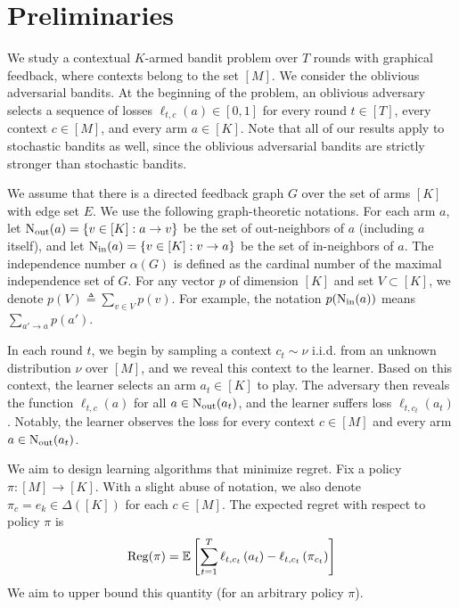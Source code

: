 \section{Preliminaries}
We study a contextual $K$-armed bandit problem over $T$ rounds with graphical feedback, where contexts belong to the set $[M]$. 
%
We consider the oblivious adversarial bandits.
%
At the beginning of the problem, an oblivious adversary selects a sequence of losses $\ell_{t, c}(a) \in [0,1]$ for every round $t \in[T]$, every context $c \in[M]$, and every arm $a \in[K]$. 
%
Note that all of our results apply to stochastic bandits as well, since the oblivious adversarial bandits are strictly stronger than  stochastic bandits. 

We assume that there is a directed feedback graph $G$ over the set of arms $[K]$ with edge set $E$. We use the following graph-theoretic notations.  For each arm $a$, let $\operatorname{N_{\text{out}}}(a) = \{v \in [K]: a \rightarrow v\}$ be the set of out-neighbors of $a$ (including $a$ itself), and let $\operatorname{N_{\text{in}}}(a)=\{v \in [K]: v \rightarrow a\}$ be the set of in-neighbors of $a$. The independence number $\alpha(G)$ is defined as the cardinal number of the maximal independence set of $G$. For any vector $p$ of dimension $[K]$ and set $V \subset [K]$, we denote $p(V) \triangleq \sum_{v \in V} p(v)$. For example, the notation $p(\operatorname{N_{\text{in}}}(a))$ means $\sum_{a' \rightarrow a} p(a')$.

In each round $t$, we begin by sampling a context $c_t \sim \nu$ i.i.d. from an unknown distribution $\nu$ over $[M]$, and we reveal this context to the learner. 
%
Based on this context, the learner selects an arm $a_t \in[K]$ to play.
%
The adversary then reveals the function $\ell_{t, c}\left(a\right)$ for all $a \in \operatorname{N_{\text{out}}}(a_t)$, and the learner suffers loss $\ell_{t, c_t}\left(a_t\right)$. 
%
Notably, the learner observes the loss for every context $c \in[M]$ and every arm $a \in \operatorname{N_{\text{out}}}(a_t)$.
%


We aim to design learning algorithms that minimize regret. 
%
Fix a policy $\pi:[M] \rightarrow[K]$.
%
With a slight abuse of notation, we also denote $\pi_c=e_k \in \Delta([K])$ for each $c \in[M]$. 
%
The expected regret with respect to policy $\pi$ is
\[\operatorname{\mathrm{Reg}}(\pi)=\mathbb{E} \left[ \sum_{t=1}^T \ell_{t, c_t}\left(a_t\right)-\ell_{t, c_t}\left(\pi_{c_t}\right)\right]\]
We aim to upper bound this quantity (for an arbitrary policy $\pi$).
